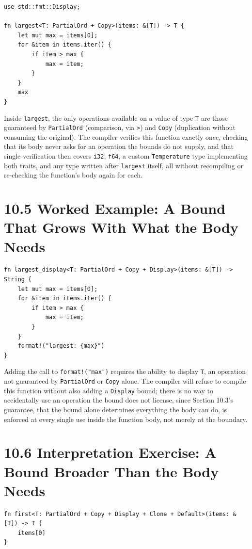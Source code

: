 \documentclass[11pt]{book}
\begin{document}
\begin{lstlisting}
use std::fmt::Display;

fn largest<T: PartialOrd + Copy>(items: &[T]) -> T {
    let mut max = items[0];
    for &item in items.iter() {
        if item > max {
            max = item;
        }
    }
    max
}
\end{lstlisting}

Inside \texttt{largest}, the only operations available on a value of type \texttt{T} are those guaranteed by \texttt{PartialOrd} (comparison, via \texttt{>}) and \texttt{Copy} (duplication without consuming the original). The compiler verifies this function exactly once, checking that its body never asks for an operation the bounds do not supply, and that single verification then covers \texttt{i32}, \texttt{f64}, a custom \texttt{Temperature} type implementing both traits, and any type written after \texttt{largest} itself, all without recompiling or re-checking the function's body again for each.

\section*{10.5 Worked Example: A Bound That Grows With What the Body Needs}

\begin{lstlisting}
fn largest_display<T: PartialOrd + Copy + Display>(items: &[T]) -> String {
    let mut max = items[0];
    for &item in items.iter() {
        if item > max {
            max = item;
        }
    }
    format!("largest: {max}")
}
\end{lstlisting}

Adding the call to \texttt{format!("{max}")} requires the ability to display \texttt{T}, an operation not guaranteed by \texttt{PartialOrd} or \texttt{Copy} alone. The compiler will refuse to compile this function without also adding a \texttt{Display} bound; there is no way to accidentally use an operation the bound does not license, since Section 10.3's guarantee, that the bound alone determines everything the body can do, is enforced at every single use inside the function body, not merely at the boundary.

\section*{10.6 Interpretation Exercise: A Bound Broader Than the Body Needs}

\begin{lstlisting}
fn first<T: PartialOrd + Copy + Display + Clone + Default>(items: &[T]) -> T {
    items[0]
}
\end{lstlisting}
\end{document}
